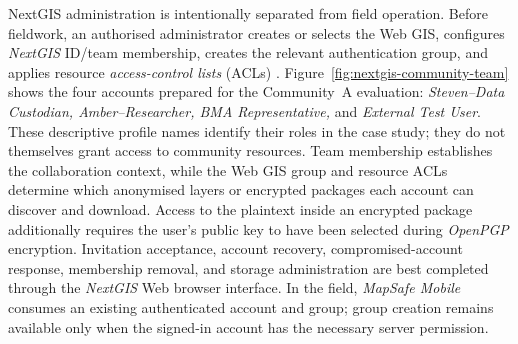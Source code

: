 \documentclass[]{interact}
\begin{document}
%

NextGIS administration is intentionally separated from field operation. Before fieldwork, an authorised administrator creates or selects the Web GIS, configures \textit{NextGIS} ID/team membership, creates the relevant authentication group, and applies resource \textit{access-control lists} (ACLs) \citep{nextgis2026users,nextgis2026permissions}. Figure~\ref{fig:nextgis-community-team} shows the four accounts prepared for the Community~A evaluation: \textit{Steven--Data Custodian, Amber--Researcher, BMA Representative,} and \textit{External Test User}. These descriptive profile names identify their roles in the case study; they do not themselves grant access to community resources. Team membership establishes the collaboration context, while the Web GIS group and resource ACLs determine which anonymised layers or encrypted packages each account can discover and download. Access to the plaintext inside an encrypted package additionally requires the user's public key to have been selected during \textit{OpenPGP} encryption. Invitation acceptance, account recovery, compromised-account response, membership removal, and storage administration are best completed through the \textit{NextGIS} Web browser interface. In the field, \textit{MapSafe Mobile} consumes an existing authenticated account and group; group creation remains available only when the signed-in account has the necessary server permission.
\end{document}
